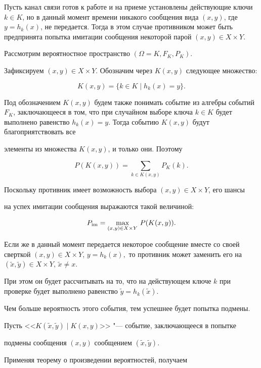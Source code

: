 Пусть канал связи готов к работе и на приеме установлены действующие ключи $k \in K$, но в данный момент времени никакого сообщения вида $(x,y)$, где $y=h_k(x)$, не передается. Тогда в этом случае противником может быть предпринята попытка имитации сообщения некоторой парой $({x}, {y}) \in  X\times Y$.



Рассмотрим вероятностное пространство $(\Omega = K, F_K, P_K)$.

Зафиксируем $(x,y) \in  X\times Y$. Обозначим через $K(x,y)$ следующее множество:

$$

K(x,y) = \{k \in K \mid h_k(x) = y\}.

$$

Под обозначением $K(x,y)$ будем также понимать событие из алгебры событий $F_K$, заключающееся в том, что при случайном выборе ключа $k \in

K$ будет выполнено равенство $h_k(x)=y$. Тогда событию $K(x,y)$ будут благоприятствовать все

элементы из множества $K(x,y)$, и только они. Поэтому

$$

P(K(x,y)) = \sum_{k \in K(x,y)}P_K(k).

$$

Поскольку противник имеет возможность выбора $(x,y) \in  X\times Y$, его шансы

на успех имитации сообщения выражаются такой величиной:

$$

P_{\rm im} = {\mathop{\max}_{(x,y) \in  X\times Y}} ~P(K(x,y)).

$$

Если же в данный момент передается некоторое сообщение вместе со своей сверткой $(x,y) \in  X\times Y$, $y=h_k(x),$ то противник может заменить его на $(\widetilde{x},\widetilde{y}) \in X\times Y$, $\widetilde{x} \neq x$. 

При этом он будет рассчитывать на то, что на действующем ключе $k$ при проверке будет выполнено равенство $\widetilde{y} = h_k(\widetilde{x})$.

Чем больше вероятность этого события, тем успешнее будет попытка подмены.

Пусть <<$K(\widetilde{x},\widetilde{y})  \mid  K(x,y)$>> "--- событие, заключающееся в попытке

подмены сообщения $(x,y)$ сообщением $(\widetilde{x},\widetilde{y})$. 

Применяя теорему о произведении вероятностей, получаем 

